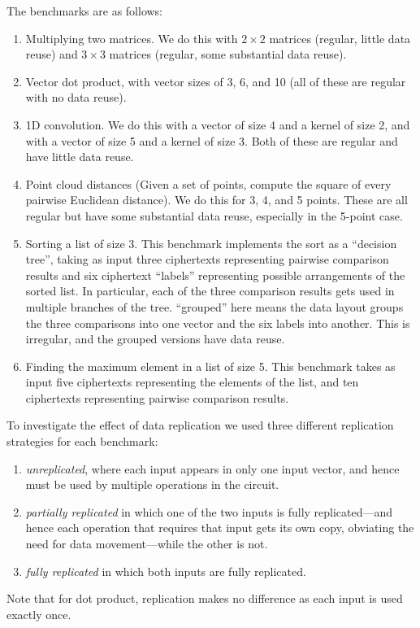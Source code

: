 The benchmarks are as follows:
\begin{enumerate}[label=\arabic*.]
    \item Multiplying two matrices. We do this with $2\times 2$ matrices (regular, little data reuse) and $3\times 3$ matrices (regular, some substantial data reuse). %
    \item Vector dot product, with vector sizes of 3, 6, and 10 (all of these are regular with no data reuse).
    \item 1D convolution. We do this with a vector of size 4 and a kernel of size 2, and with a vector of size 5 and a kernel of size 3. Both of these are regular and have little data reuse.
    \item Point cloud distances (Given a set of points, compute the square of every pairwise Euclidean distance). We do this for 3, 4, and 5 points. These are all regular but have some substantial data reuse, especially in the 5-point case.
    \item Sorting a list of size 3. This benchmark implements the sort as a ``decision tree'', taking as input three ciphertexts representing pairwise comparison results and six ciphertext ``labels'' representing possible arrangements of the sorted list. In particular, each of the three comparison results gets used in multiple branches of the tree. ``grouped'' here means the data layout groups the three comparisons into one vector and the six labels into another. This is irregular, and the grouped versions have data reuse.
    \item Finding the maximum element in a list of size 5. This benchmark takes as input five ciphertexts representing the elements of the list, and ten ciphertexts representing pairwise comparison results.
\end{enumerate}


To investigate the effect of data replication we used three different replication strategies for each benchmark: 

\begin{enumerate}[label=(\roman*)]
\item {\em unreplicated}, where each input appears in only one input vector, and hence must be used by multiple operations in the circuit.
\item {\em partially replicated} in which one of the two inputs is fully replicated---and hence each operation that requires that input gets its own copy, obviating the need for data movement---while the other is not.
\item {\em fully replicated} in which both inputs are fully replicated. 
\end{enumerate}
Note that for dot product, replication makes no difference as each input is used exactly once.

